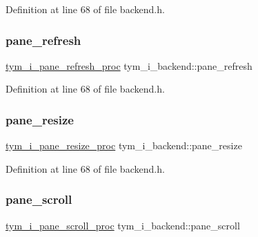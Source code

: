 Definition at line 68 of file backend.\+h.

\mbox{\label{structtym__i__backend_af190f73df64b296e3af5dfea90e560b4}} 
\subsubsection{\texorpdfstring{pane\+\_\+refresh}{pane\_refresh}}
{\footnotesize\ttfamily \hyperlink{backend_8h_a99b50ea4d7c5349b4df1e879b2140a97}{tym\+\_\+i\+\_\+pane\+\_\+refresh\+\_\+proc} tym\+\_\+i\+\_\+backend\+::pane\+\_\+refresh}



Definition at line 68 of file backend.\+h.

\mbox{\label{structtym__i__backend_a625938e1dcc5d0b40561b42c0d37a794}} 
\subsubsection{\texorpdfstring{pane\+\_\+resize}{pane\_resize}}
{\footnotesize\ttfamily \hyperlink{backend_8h_ae66adc784ab9e9adcb7f43713798b754}{tym\+\_\+i\+\_\+pane\+\_\+resize\+\_\+proc} tym\+\_\+i\+\_\+backend\+::pane\+\_\+resize}



Definition at line 68 of file backend.\+h.

\mbox{\label{structtym__i__backend_aa1f08a3ae4b68a6b987c928a091ff80f}} 
\subsubsection{\texorpdfstring{pane\+\_\+scroll}{pane\_scroll}}
{\footnotesize\ttfamily \hyperlink{backend_8h_ab44bedb286c42c2994bf88375e64176f}{tym\+\_\+i\+\_\+pane\+\_\+scroll\+\_\+proc} tym\+\_\+i\+\_\+backend\+::pane\+\_\+scroll}



